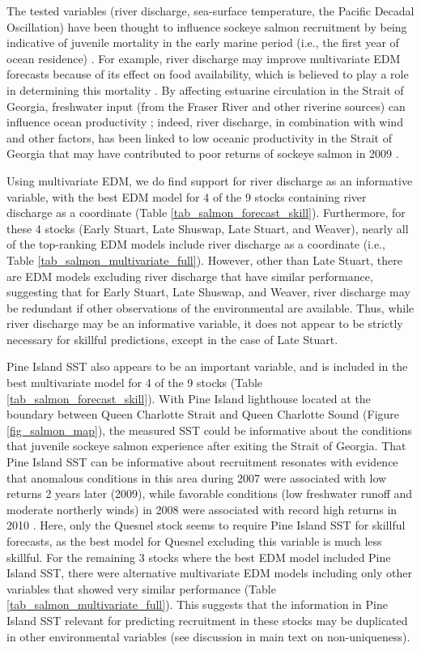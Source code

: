 The tested variables (river discharge, sea-surface temperature, the Pacific Decadal Oscillation) have been thought to influence sockeye salmon recruitment by being indicative of juvenile mortality in the early marine period (i.e., the first year of ocean residence) \cite{Beamish_2004}. For example, river discharge may improve multivariate EDM forecasts because of its effect on food availability, which is believed to play a role in determining this mortality \cite{Beamish_2012}. By affecting estuarine circulation in the Strait of Georgia, freshwater input (from the Fraser River and other riverine sources) can influence ocean productivity \cite{Beamish_1994}; indeed, river discharge, in combination with wind and other factors, has been linked to low oceanic productivity in the Strait of Georgia that may have contributed to poor returns of sockeye salmon in 2009 \cite{Beamish_2012, Thomson_2012}.

Using multivariate EDM, we do find support for river discharge as an informative variable, with the best EDM model for 4 of the 9 stocks containing river discharge as a coordinate (Table \ref{tab_salmon_forecast_skill}). Furthermore, for these 4 stocks (Early Stuart, Late Shuswap, Late Stuart, and Weaver), nearly all of the top-ranking EDM models include river discharge as a coordinate (i.e., Table \ref{tab_salmon_multivariate_full}). However, other than Late Stuart, there are EDM models excluding river discharge that have similar performance, suggesting that for Early Stuart, Late Shuswap, and Weaver, river discharge may be redundant if other observations of the environmental are available. Thus, while river discharge may be an informative variable, it does not appear to be strictly necessary for skillful predictions, except in the case of Late Stuart.

Pine Island SST also appears to be an important variable, and is included in the best multivariate model for 4 of the 9 stocks (Table \ref{tab_salmon_forecast_skill}). With Pine Island lighthouse located at the boundary between Queen Charlotte Strait and Queen Charlotte Sound (Figure \ref{fig_salmon_map}), the measured SST could be informative about the conditions that juvenile sockeye salmon experience after exiting the Strait of Georgia. That Pine Island SST can be informative about recruitment resonates with evidence that anomalous conditions in this area during 2007 were associated with low returns 2 years later (2009), while favorable conditions (low freshwater runoff and moderate northerly winds) in 2008 were associated with record high returns in 2010 \cite{Thomson_2012}. Here, only the Quesnel stock seems to require Pine Island SST for skillful forecasts, as the best model for Quesnel excluding this variable is much less skillful. For the remaining 3 stocks where the best EDM model included Pine Island SST, there were alternative multivariate EDM models including only other variables that showed very similar performance (Table \ref{tab_salmon_multivariate_full}). This suggests that the information in Pine Island SST relevant for predicting recruitment in these stocks may be duplicated in other environmental variables (see discussion in main text on non-uniqueness).

